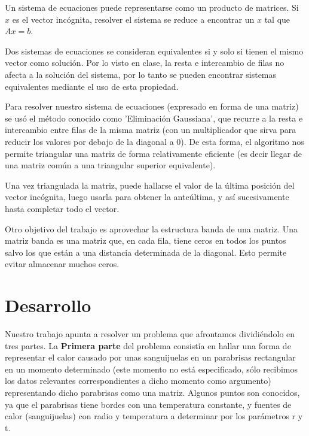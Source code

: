 \documentclass[spanish,a4paper]{article}
\begin{document}
Un sistema de ecuaciones puede representarse como un producto de matrices. Si $x$ es el vector incógnita, resolver el sistema se reduce a encontrar un $x$ tal que $Ax=b$.          

Dos sistemas de ecuaciones se consideran equivalentes si y solo si tienen el mismo vector como solución. Por lo visto en clase, la resta e intercambio de filas no afecta a la solución del sistema, por lo tanto se pueden encontrar sistemas equivalentes mediante el uso de esta propiedad.

Para resolver nuestro sistema de ecuaciones (expresado en forma de una matriz) se usó el método conocido como 'Eliminación Gaussiana', que recurre a la resta e intercambio entre filas de la misma matriz (con un multiplicador que sirva para reducir los valores por debajo de la diagonal a 0). De esta forma, el algoritmo nos permite triangular una matriz de forma relativamente eficiente (es decir llegar de una matriz común a una triangular superior equivalente).

Una vez triangulada la matriz, puede hallarse el valor de la última posición del vector incógnita, luego usarla para obtener la anteúltima, y así sucesivamente hasta completar todo el vector.

Otro objetivo del trabajo es aprovechar la estructura banda de una matriz. Una matriz banda es una matriz que, en cada fila, tiene ceros en todos los puntos salvo los que están a una distancia determinada de la diagonal. Esto permite evitar almacenar muchos ceros.

\newpage

\section{Desarrollo}
\label{sec:desarrollo}

Nuestro trabajo apunta a resolver un problema que afrontamos dividiéndolo en tres partes. \newline \newline
La \textbf{Primera parte} del problema consistía en hallar una forma de representar el calor causado por unas sanguijuelas en un parabrisas rectangular en un momento determinado (este momento no está especificado, sólo recibimos los datos relevantes correspondientes a dicho momento como argumento) representando dicho parabrisas como una matriz. Algunos puntos son conocidos, ya que el parabrisas tiene bordes con una temperatura constante, y fuentes de calor (sanguijuelas) con radio y temperatura a determinar por los parámetros r y t.
\end{document}
